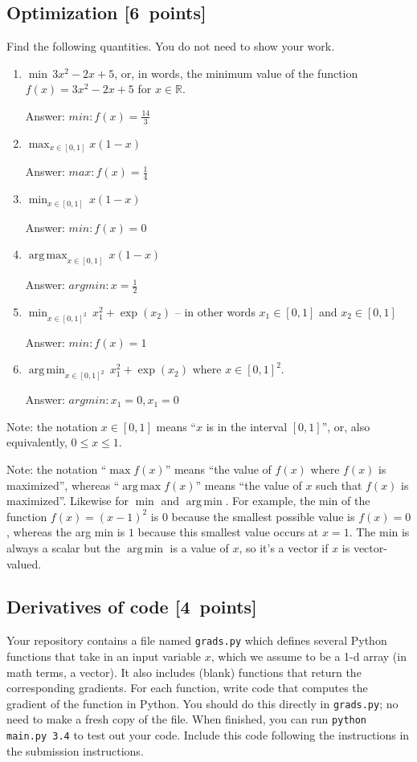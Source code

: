 \documentclass{article}
\newcommand{\blu}[1]{{\textcolor{blu}{#1}}}
\newcommand{\gre}[1]{\textcolor{gre}{#1}}
\newcommand\ans[1]{\par\gre{Answer: #1}}
\let\ask\blu
\newcommand\pts[1]{\textcolor{pointscolour}{[#1~points]}}
\def\R{\mathbb{R}}
\DeclareMathOperator*{\argmax}{arg\,max}
\DeclareMathOperator*{\argmin}{arg\,min}
\begin{document}
  \subsection{Optimization \pts{6}}

  \ask{Find the following quantities.} You do not need to show your work.
  

  \begin{enumerate}
  \item $\min \, 3x^2-2x+5$, or, in words, the minimum value of the function $f(x) = 3x^2 -2x + 5$ for $x \in \R$.
  \ans{$min: f(x) = \frac{14}{3}$}
  \item $\max_{x \in [0, 1]} x(1-x)$
  \ans{$max: f(x) = \frac{1}{4}$}
  \item $\min_{x \in [0, 1]} \, x(1-x)$
  \ans{$min: f(x) = 0$}
  \item $\argmax_{x \in [0,1]} \, x(1-x)$
  \ans{$argmin: x = \frac{1}{2}$}
  \item $\min_{x \in [0, 1]^2} \, x_1^2 + \exp(x_2)$ -- in other words $x_1\in [0,1]$ and $x_2\in [0,1]$
  \ans{$min: f(x) = 1$}
  \item $\argmin_{x \in [0,1]^2} \, x_1^2 + \exp(x_2)$ where $x \in [0,1]^2$.
  \ans{$argmin: x_1 = 0, x_1 = 0$}
  \end{enumerate}

  Note: the notation $x\in [0,1]$ means ``$x$ is in the interval $[0,1]$'', or, also equivalently, $0 \leq x \leq 1$.

  Note: the notation ``$\max f(x)$'' means ``the value of $f(x)$ where $f(x)$ is maximized'', whereas ``$\argmax  f(x)$'' means ``the value of $x$ such that $f(x)$ is maximized''.
  Likewise for $\min$ and $\argmin$. For example, the min of the function $f(x)=(x-1)^2$ is $0$ because the smallest possible value is $f(x)=0$,
  whereas the arg min is $1$ because this smallest value occurs at $x=1$. The min is always a scalar but the $\argmin$ is a value of $x$, so it's a vector
  if $x$ is vector-valued.

  \newpage

  \subsection{Derivatives of code \pts{4}}

  Your repository contains a file named \texttt{grads.py} which defines several Python functions that take in an input variable $x$, which we assume to be a 1-d array (in math terms, a vector).
  It also includes (blank) functions that return the corresponding gradients.
  For each function, \ask{write code that computes the gradient of the function} in Python.
  You should do this directly in \texttt{grads.py}; no need to make a fresh copy of the file. When finished, you can run \texttt{python main.py 3.4} to test out your code. \ask{Include this code following the instructions in the submission instructions.}
\end{document}
